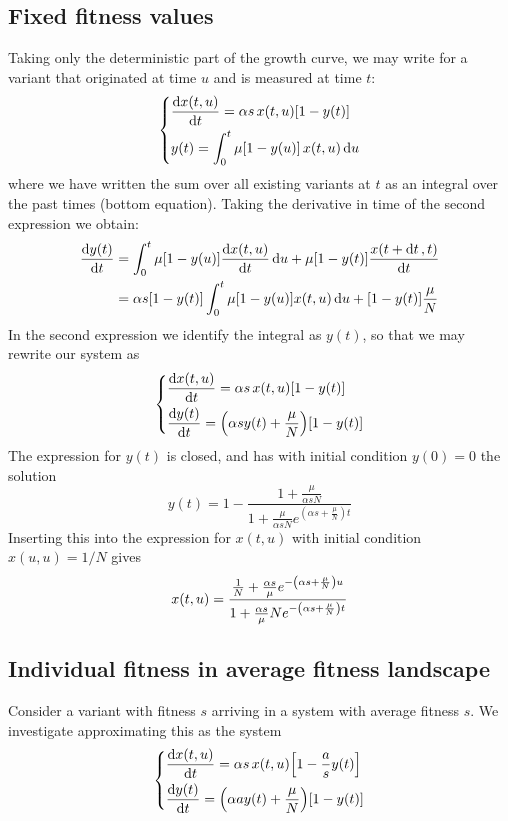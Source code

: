 \documentclass[pdftex,12pt,a4paper]{scrartcl}
\begin{document}
\subsection{Fixed fitness values}
Taking only the deterministic part of the growth curve, we may write for a variant that originated at time $u$ and is measured at time $t$:
\begin{equation}
\left\lbrace
\begin{aligned}
    &\dv{x(t,u)}{t} = \alpha s \, x(t,u)\qty[1 - y(t)] \\
    &y(t) = \int_0^t \mu \qty[1-y(u)] \, x(t,u) \dd{u}
\end{aligned}
\right.
\end{equation}
where we have written the sum over all existing variants at $t$ as an integral over the past times (bottom equation). Taking the derivative in time of the second expression we obtain:
\begin{align*}
    \dv{y(t)}{t} &= \int_0^t \mu \qty[1-y(u)] \dv{x(t,u)}{t} \dd{u} + \mu \qty[1-y(t)] \frac{{x(t+\dd{t},t)}}{\dd{t}} \\
    &=  \alpha s \qty[1 - y(t)] \int_0^t \mu \qty[1-y(u)] x(t,u) \dd{u} + \qty[1-y(t)] \frac{\mu}{N}
\end{align*}
In the second expression we identify the integral as $y(t)$, so that we may rewrite our system as
\begin{equation}
    \left\lbrace
    \begin{aligned}
        &\dv{x(t,u)}{t} = \alpha s \, x(t,u)\qty[1 - y(t)] \\
        &\dv{y(t)}{t} = \qty( \alpha s y(t) + \frac{\mu}{N} )\qty[1-y(t)]
    \end{aligned}
    \right.
\end{equation}
The expression for $y(t)$ is closed, and has with initial condition $y(0)=0$ the solution
\begin{equation}
    y(t) = 1-\frac{1 +\frac{\mu}{\alpha s N} }{1 + \frac{\mu}{\alpha s N}  e^{\left(\alpha s +\frac{\mu}{N}\right) t}}
\end{equation}
Inserting this into the expression for $x(t,u)$ with initial condition $x(u,u)=1/N$ gives
\begin{equation}
    x(t,u) = \frac{\frac{1}{N} + \frac{\alpha s}{\mu}e^{-\qty(\alpha s +\frac{\mu}{N})u}}{1 + \frac{\alpha s}{\mu} N e^{-\qty(\alpha s  +\frac{\mu}{N})t}}
\end{equation}

\subsection{Individual fitness in average fitness landscape}
Consider a variant with fitness $s$ arriving in a system with average fitness $s$. We investigate approximating this as the system
\begin{equation}
    \left\lbrace
    \begin{aligned}
        &\dv{x(t,u)}{t} = \alpha s \, x(t,u)\qty[1 - \frac{a}{s}y(t)] \\
        &\dv{y(t)}{t} = \qty( \alpha a y(t) + \frac{\mu}{N} )\qty[1-y(t)]
    \end{aligned}
    \right.
\end{equation}
\end{document}
